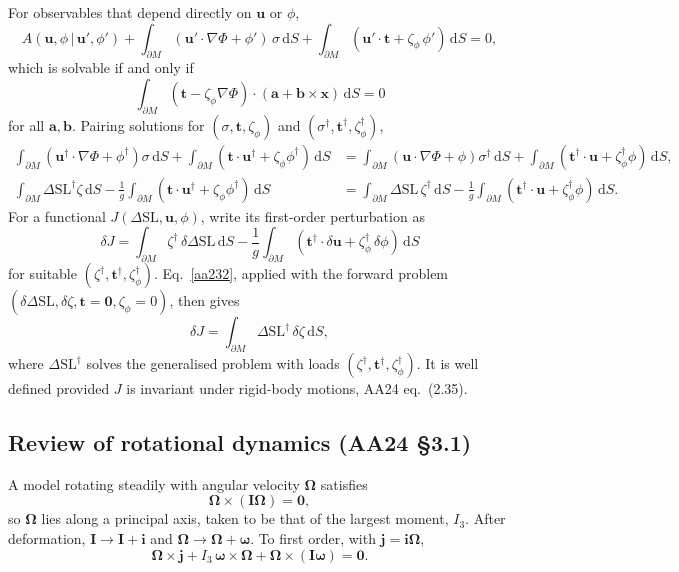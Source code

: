 \documentclass[11pt,a4paper]{article}
\newcommand{\bO}{\bm{\Omega}}
\newcommand{\bw}{\bm{\omega}}
\newcommand{\bx}{\mathbf{x}}
\newcommand{\bu}{\mathbf{u}}
\newcommand{\ba}{\mathbf{a}}
\newcommand{\bb}{\mathbf{b}}
\newcommand{\bt}{\mathbf{t}}
\newcommand{\bj}{\mathbf{j}}
\newcommand{\bI}{\mathbf{I}}
\newcommand{\bi}{\mathbf{i}}
\newcommand{\dSL}{\Delta\mathrm{SL}}
\newcommand{\dd}{\,\mathrm{d}}
\newcommand{\pM}{\partial M}
\begin{document}
For observables that depend directly on $\bu$ or $\phi$,
\begin{equation}
  A(\bu,\phi\,|\,\bu',\phi')+\int_{\pM}(\bu'\cdot\nabla\Phi+\phi')\,\sigma\dd S
  +\int_{\pM}(\bu'\cdot\bt+\zeta_\phi\,\phi')\dd S=0,
  \tag{2.29}\label{aa229}
\end{equation}
which is solvable if and only if
\begin{equation}
  \int_{\pM}(\bt-\zeta_\phi\nabla\Phi)\cdot(\ba+\bb\times\bx)\dd S=0
  \tag{2.30}\label{aa230}
\end{equation}
for all $\ba,\bb$. Pairing solutions for $(\sigma,\bt,\zeta_\phi)$ and
$(\sigma^\dagger,\bt^\dagger,\zeta^\dagger_\phi)$,
\begin{align}
  \int_{\pM}(\bu^\dagger\cdot\nabla\Phi+\phi^\dagger)\sigma\dd S+\int_{\pM}(\bt\cdot\bu^\dagger+\zeta_\phi\phi^\dagger)\dd S
  &=\int_{\pM}(\bu\cdot\nabla\Phi+\phi)\sigma^\dagger\dd S+\int_{\pM}(\bt^\dagger\cdot\bu+\zeta^\dagger_\phi\phi)\dd S,
  \tag{2.31}\label{aa231}\\
  \int_{\pM}\dSL^\dagger\zeta\dd S-\frac{1}{g}\int_{\pM}(\bt\cdot\bu^\dagger+\zeta_\phi\phi^\dagger)\dd S
  &=\int_{\pM}\dSL\,\zeta^\dagger\dd S-\frac{1}{g}\int_{\pM}(\bt^\dagger\cdot\bu+\zeta^\dagger_\phi\phi)\dd S.
  \tag{2.32}\label{aa232}
\end{align}
For a functional $J(\dSL,\bu,\phi)$, write its first-order perturbation as
\begin{equation}
  \delta J=\int_{\pM}\zeta^\dagger\,\delta\dSL\dd S-\frac1g\int_{\pM}(\bt^\dagger\cdot\delta\bu+\zeta^\dagger_\phi\,\delta\phi)\dd S
  \tag{2.33}\label{aa233}
\end{equation}
for suitable $(\zeta^\dagger,\bt^\dagger,\zeta^\dagger_\phi)$. Eq.~\eqref{aa232}, applied with the
forward problem $(\delta\dSL,\delta\zeta,\bt=\mathbf{0},\zeta_\phi=0)$, then gives
\begin{equation}
  \delta J=\int_{\pM}\dSL^\dagger\,\delta\zeta\dd S ,
  \tag{2.34}\label{aa234}
\end{equation}
where $\dSL^\dagger$ solves the generalised problem with loads $(\zeta^\dagger,\bt^\dagger,\zeta^\dagger_\phi)$.
It is well defined provided $J$ is invariant under rigid-body motions, AA24 eq.~(2.35).

\subsection{Review of rotational dynamics (AA24 \S3.1)}
\label{sec:aa31}

A model rotating steadily with angular velocity $\bO$ satisfies
\begin{equation}
  \bO\times(\bI\bO)=\mathbf{0},
  \tag{3.1}\label{aa31}
\end{equation}
so $\bO$ lies along a principal axis, taken to be that of the largest moment, $I_3$. After
deformation, $\bI\to\bI+\bi$ and $\bO\to\bO+\bw$. To first order, with $\bj=\bi\bO$,
\begin{equation}
  \bO\times\bj+I_3\,\bw\times\bO+\bO\times(\bI\bw)=\mathbf{0}.
  \tag{3.2}\label{aa32}
\end{equation}
\end{document}
